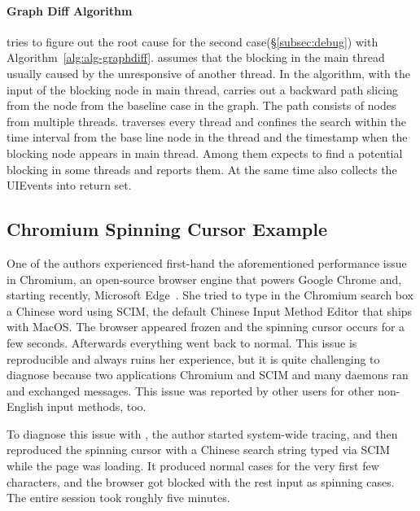 \paragraph{Graph Diff Algorithm}

\xxx tries to figure out the root cause for the second
case(\S\ref{subsec:debug}) with Algorithm~\ref{alg:alg-graphdiff}. \xxx assumes
that the blocking in the main thread usually caused by the unresponsive of
another thread. In the algorithm, with the input of the blocking node in main
thread, \xxx carries out a backward path slicing from the node from the baseline
case in the graph. The path consists of nodes from multiple threads. \xxx
traverses every thread and confines the search within the time interval from the
base line node in the thread and the timestamp when the blocking node appears
in main thread. Among them \xxx expects to find a potential blocking in some
threads and reports them. At the same time \xxx also collects the UIEvents into
return set.

\subsection{Chromium Spinning Cursor Example}


One of the authors experienced first-hand the aforementioned performance issue
in Chromium, an open-source browser engine that powers Google Chrome and,
starting recently, Microsoft Edge~\cite{chromiumurl}.  She tried to type in the
Chromium search box a Chinese word using SCIM, the default Chinese Input Method
Editor that ships with MacOS.  The browser appeared frozen and the spinning
cursor occurs for a few seconds.  Afterwards everything went back to normal.
This issue is reproducible and always ruins her experience, but it is quite
challenging to diagnose because two applications Chromium and SCIM and many
daemons ran and exchanged messages.  This issue was reported by other users for
other non-English input methods, too.

To diagnose this issue with \xxx, the author started system-wide tracing, and
then reproduced the spinning cursor with a Chinese search string typed via SCIM
while the page was loading. It produced normal cases for the very first few
characters, and the browser got blocked with the rest input as spinning cases.
The entire session took roughly five minutes.


